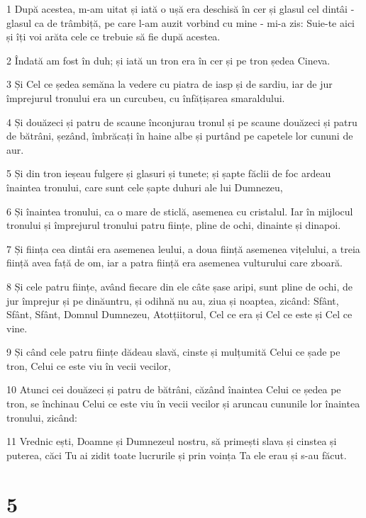 \par 1 După acestea, m-am uitat și iată o ușă era deschisă în cer și glasul cel dintâi - glasul ca de trâmbiță, pe care l-am auzit vorbind cu mine - mi-a zis: Suie-te aici și îți voi arăta cele ce trebuie să fie după acestea.
\par 2 Îndată am fost în duh; și iată un tron era în cer și pe tron ședea Cineva.
\par 3 Și Cel ce ședea semăna la vedere cu piatra de iasp și de sardiu, iar de jur împrejurul tronului era un curcubeu, cu înfățișarea smaraldului.
\par 4 Și douăzeci și patru de scaune înconjurau tronul și pe scaune douăzeci și patru de bătrâni, șezând, îmbrăcați în haine albe și purtând pe capetele lor cununi de aur.
\par 5 Și din tron ieșeau fulgere și glasuri și tunete; și șapte făclii de foc ardeau înaintea tronului, care sunt cele șapte duhuri ale lui Dumnezeu,
\par 6 Și înaintea tronului, ca o mare de sticlă, asemenea cu cristalul. Iar în mijlocul tronului și împrejurul tronului patru ființe, pline de ochi, dinainte și dinapoi.
\par 7 Și ființa cea dintâi era asemenea leului, a doua ființă asemenea vițelului, a treia ființă avea față de om, iar a patra ființă era asemenea vulturului care zboară.
\par 8 Și cele patru ființe, având fiecare din ele câte șase aripi, sunt pline de ochi, de jur împrejur și pe dinăuntru, și odihnă nu au, ziua și noaptea, zicând: Sfânt, Sfânt, Sfânt, Domnul Dumnezeu, Atotțiitorul, Cel ce era și Cel ce este și Cel ce vine.
\par 9 Și când cele patru ființe dădeau slavă, cinste și mulțumită Celui ce șade pe tron, Celui ce este viu în vecii vecilor,
\par 10 Atunci cei douăzeci și patru de bătrâni, căzând înaintea Celui ce ședea pe tron, se închinau Celui ce este viu în vecii vecilor și aruncau cununile lor înaintea tronului, zicând:
\par 11 Vrednic ești, Doamne și Dumnezeul nostru, să primești slava și cinstea și puterea, căci Tu ai zidit toate lucrurile și prin voința Ta ele erau și s-au făcut.

\chapter{5}

